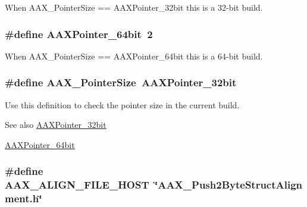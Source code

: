When A\+A\+X\+\_\+\+Pointer\+Size == A\+A\+X\+Pointer\+\_\+32bit this is a 32-\/bit build. 

\hypertarget{a00149_a1a53e919284726babb582d3bb105b08b}{}
\subsubsection[{A\+A\+X\+Pointer\+\_\+64bit}]{\setlength{\rightskip}{0pt plus 5cm}\#define A\+A\+X\+Pointer\+\_\+64bit~2}\label{a00149_a1a53e919284726babb582d3bb105b08b}


When A\+A\+X\+\_\+\+Pointer\+Size == A\+A\+X\+Pointer\+\_\+64bit this is a 64-\/bit build. 

\hypertarget{a00149_a078a28903a34f1bd25f1e23d65df6212}{}
\subsubsection[{A\+A\+X\+\_\+\+Pointer\+Size}]{\setlength{\rightskip}{0pt plus 5cm}\#define A\+A\+X\+\_\+\+Pointer\+Size~{\bf A\+A\+X\+Pointer\+\_\+32bit}}\label{a00149_a078a28903a34f1bd25f1e23d65df6212}


Use this definition to check the pointer size in the current build. 

\begin{DoxySeeAlso}{See also}
\hyperlink{a00149_a3310096b753437bda7ec67de445cf9cb}{A\+A\+X\+Pointer\+\_\+32bit} 

\hyperlink{a00149_a1a53e919284726babb582d3bb105b08b}{A\+A\+X\+Pointer\+\_\+64bit} 
\end{DoxySeeAlso}
\hypertarget{a00149_acbef7ed7d077bc9812cb56417e1ad325}{}
\subsubsection[{A\+A\+X\+\_\+\+A\+L\+I\+G\+N\+\_\+\+F\+I\+L\+E\+\_\+\+H\+O\+S\+T}]{\setlength{\rightskip}{0pt plus 5cm}\#define A\+A\+X\+\_\+\+A\+L\+I\+G\+N\+\_\+\+F\+I\+L\+E\+\_\+\+H\+O\+S\+T~\char`\"{}A\+A\+X\+\_\+\+Push2\+Byte\+Struct\+Alignment.\+h\char`\"{}}\label{a00149_acbef7ed7d077bc9812cb56417e1ad325}


